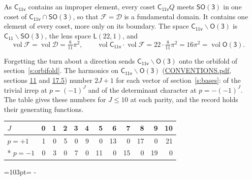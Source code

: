 \documentclass[10pt,a4paper]{article}
\newcommand{\needspace}[1]{\par\penalty-100\begingroup\dimen0=#1\relax\dimen2=\pagegoal
  \advance\dimen2-\pagetotal\ifdim\dimen0>\dimen2\relax\ifdim\dimen2>0pt\vfil\break\fi\fi
  \endgroup}
\numberwithin{equation}{section}
\newcommand{\grp}[1]{\mathsf{#1}}
\newcommand{\vol}{\operatorname{vol}}
\newcommand{\fcell}{\mathcal{D}}
\newcommand{\fdomain}{\mathcal{F}}
\newcommand{\lensspace}[2]{\mathsf{L}(#1, #2)}
\begin{document}
\leavevmode\label{n:set.fundamental}As $\grp{C_{11v}}$ contains an improper element, every coset $\grp{C_{11v}}Q$ meets \href{SO3.pdf}{$\grp{SO(3)}$} in one coset of $\grp{C_{11v}} \cap \grp{SO(3)}$, so that $\fdomain = \fcell$ is a fundamental domain. It contains one element of every coset, more only on its boundary.
\leavevmode\label{n:set.lens}The space $\grp{C_{11v}}\backslash\grp{O(3)}$ is $\grp{C_{11}}\backslash\grp{SO(3)}$, the lens space $\lensspace{22}{1}$, and
\begin{equation}\label{e:volume}\vol\fdomain = \vol\fcell = \tfrac{8}{11}\pi^2,\qquad \vol\grp{C_{11v}}\cdot\vol\fdomain = 22\cdot \tfrac{8}{11}\pi^2 = 16\pi^2 = \vol\grp{O(3)}.\end{equation}

Forgetting the turn about a direction sends $\grp{C_{11v}}\backslash\grp{O(3)}$ onto the orbifold of section~\ref{s:orbifold}.
The harmonics on $\grp{C_{11v}}\backslash\grp{O(3)}$ (\href{../../CONVENTIONS.pdf}{CONVENTIONS.pdf}, sections \href{../../CONVENTIONS.pdf\#conv.11}{11} and \href{../../CONVENTIONS.pdf\#conv.17.5}{17.5}) number $2J + 1$ for each vector of section~\ref{s:bases}: of the trivial irrep at $p = (-1)^J$ and of the determinant character at $p = -(-1)^J$. The table gives these numbers for $J \le 10$ at each parity, and the record holds their generating functions.
{\small\setlength{\tabcolsep}{4pt}\begin{longtable}{@{}lrrrrrrrrrrr@{}}\toprule
$J$ & 0 & 1 & 2 & 3 & 4 & 5 & 6 & 7 & 8 & 9 & 10\\\midrule\endhead
\bottomrule\endfoot\endlastfoot
$p = +1$ & 1 & 0 & 5 & 0 & 9 & 0 & 13 & 0 & 17 & 0 & 21\\*
$p = -1$ & 0 & 3 & 0 & 7 & 0 & 11 & 0 & 15 & 0 & 19 & 0\\
\bottomrule\end{longtable}}
\needspace{103pt}
\end{document}
